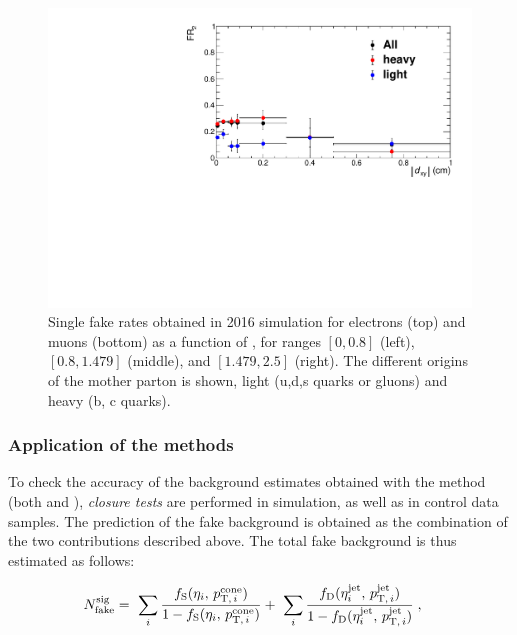 \begin{figure}[h!]
  \includegraphics[width=.32\textwidth]{Figures/c6/backgrounds/FR/sFR/QCD/dxy_mu_eta3_FR2.pdf}
  \caption{Single fake rates obtained in 2016 simulation for electrons
    (top) and muons (bottom) as
    a function of \dxy, for \abseta ranges $[0,0.8]$ (left),
    $[0.8,1.479]$ (middle), and $[1.479,2.5]$ (right). The different
origins of the mother parton is shown, light (u,d,s quarks or gluons)
and heavy (b, c quarks).}
  \label{fig:sfr_dxy}
\end{figure}
\subsubsection{Application of the \ttol methods}\label{sec:frChecks}
To check the accuracy of the background estimates obtained with the
\ttol method (both \fr and \Dfr), \emph{closure tests} are
performed in simulation, as well as in control data samples. 
The prediction of the fake background is obtained as the
combination of the two contributions described above. The total
fake background is thus estimated as follows:
\begin{linenomath}
  \begin{align*}
    N_{\mathrm{fake}}^{\mathrm{sig}} & =~ 
    \sum_i\frac{f_{\mathrm{S}}(\eta_i,\,p_{\mathrm{T,\,}i}^{\mathrm{cone}})}{1-f_{\mathrm{S}}(\eta_i,\,p_{\mathrm{T,\,}i}^{\mathrm{cone}})}
    +~
    \sum_i\frac{f_{\mathrm{D}}(\eta^{\mathrm{jet}}_i,\,p_{\mathrm{T,\,}i}^{\mathrm{jet}})}{1-f_{\mathrm{D}}(\eta^{\mathrm{jet}}_i,\,p_{\mathrm{T,\,}i}^{\mathrm{jet}})}\;,
  \end{align*}
\end{linenomath}

